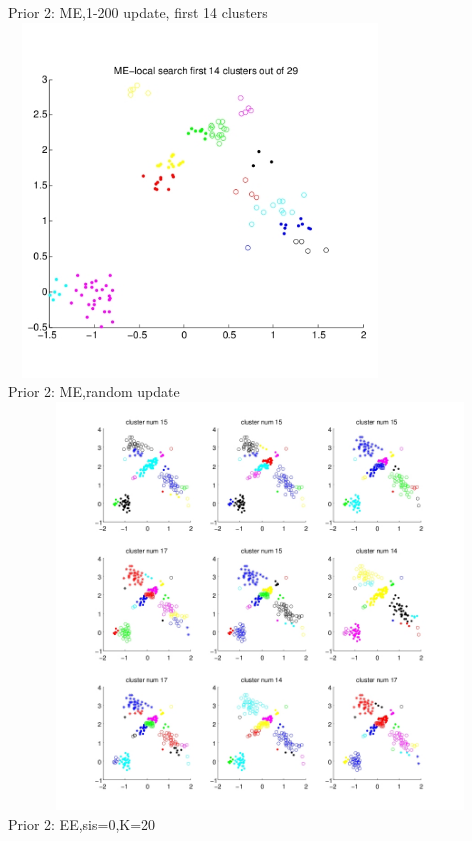 \documentclass{article}
\begin{document}
\begin{spacing}{1.1}
\begin{center}
Prior 2: ME,1-200 update, first 14 clusters \\
    \includegraphics[width=4in,height=3.7in]{1_me_1.jpg} \\ 
Prior 2: ME,random update\\
\includegraphics[width=6in,height=4.25in]{1_me_r.jpg} \\
Prior 2: EE,sis=0,K=20\\

\end{center}
\end{spacing}
\end{document}
